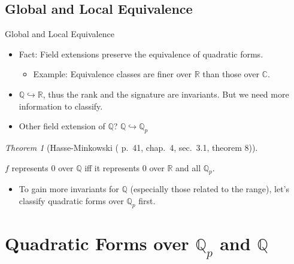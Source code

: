 \documentclass[fontset=fandol,envcountsect]{ctexbeamer}
\providecommand{\tightlist}{%
  \setlength{\itemsep}{0pt}\setlength{\parskip}{0pt}}\usepackage{longtable,booktabs,array}
\theoremstyle{theorem}
\newtheorem{theorem}{定理}
\theoremstyle{example}
\theoremstyle{remark}
\theoremstyle{theorem}
\newtheorem{theorem}{Theorem}
\theoremstyle{example}
\theoremstyle{remark}
\begin{document}
\subsection{Global and Local
Equivalence}\label{global-and-local-equivalence}

\begin{frame}{Global and Local Equivalence}
\label{global-and-local-equivalence-1}
\begin{itemize}
\item
  Fact: Field extensions preserve the equivalence of quadratic forms.

  \begin{itemize}
  \tightlist
  \item
    Example: Equivalence classes are finer over \(\mathbb R\) than those
    over \(\mathbb C\).
  \end{itemize}
\item
  \(\mathbb Q \hookrightarrow \mathbb R\), thus the rank and the
  signature are invariants. But we need more information to classify.
\item
  Other field extension of \(\mathbb Q\)?
  \(\mathbb Q \hookrightarrow \mathbb Q_p\)
\end{itemize}

\begin{theorem}[Hasse-Minkowski (\autocite{serre_course_1973} p.~41,
chap.~4, sec.~3.1, theorem
8)]\protect\hypertarget{thm-hasse-minkowski}{}\label{thm-hasse-minkowski}

\(f\) represents \(0\) over \(\mathbb Q\) iff it represents \(0\) over
\(\mathbb R\) and all \(\mathbb Q_p\).

\end{theorem}

\begin{itemize}
\tightlist
\item
  To gain more invariants for \(\mathbb Q\) (especially those related to
  the range), let's classify quadratic forms over \(\mathbb Q_p\) first.
\end{itemize}
\end{frame}

\section{\texorpdfstring{Quadratic Forms over \(\mathbb Q_p\) and
\(\mathbb Q\)}{Quadratic Forms over \textbackslash mathbb Q\_p and \textbackslash mathbb Q}}\label{quadratic-forms-over-mathbb-q_p-and-mathbb-q}
\end{document}
